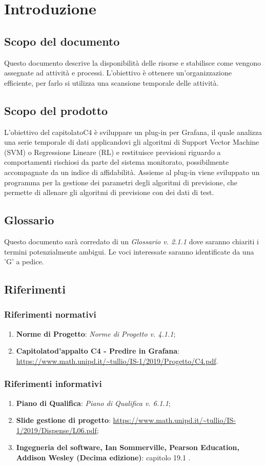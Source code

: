 \section{Introduzione}
	\subsection{Scopo del documento}
		Questo documento descrive la disponibilità delle risorse e stabilisce come vengono assegnate ad attività e processi\glo. L'obiettivo è ottenere un'organizzazione efficiente, per farlo si utilizza una scansione temporale delle attività.
	\subsection{Scopo del prodotto}
		L'obiettivo del capitolato\glosp C4 è sviluppare un plug-in per Grafana\glo, il quale analizza una serie temporale di dati applicandovi gli algoritmi di Support Vector Machine (SVM\glo) o Regressione Lineare (RL\glo) e restituisce previsioni riguardo a comportamenti rischiosi da parte del sistema monitorato, possibilmente accompagnate da un indice di affidabilità. Assieme al plug-in viene sviluppato un programma per la gestione dei parametri degli algoritmi di previsione, che permette di allenare gli algoritmi di previsione con dei dati di test.
	\subsection{Glossario}
		Questo documento sarà corredato di un \textit{Glossario v. 2.1.1} dove saranno chiariti i termini potenzialmente ambigui.
		Le voci interessate saranno identificate da una 'G' a pedice.
	\subsection{Riferimenti}
		\subsubsection{Riferimenti normativi}
			\begin{enumerate}
				\item \textbf{Norme di Progetto}: \textit{Norme di Progetto v. 4.1.1};
				\item \textbf{Capitolato}\glosp \textbf{d'appalto C4 - Predire in Grafana}\glo: \url{https://www.math.unipd.it/~tullio/IS-1/2019/Progetto/C4.pdf}.
			\end{enumerate}
		\subsubsection{Riferimenti informativi}
			\begin{enumerate}
				\item \textbf{Piano di Qualifica}: \textit{Piano di Qualifica v. 6.1.1};
				\item \textbf{Slide gestione di progetto}\glo: \url{https://www.math.unipd.it/~tullio/IS-1/2019/Dispense/L06.pdf};
				\item \textbf{Ingegneria del software, Ian Sommerville, Pearson Education, Addison Wesley (Decima edizione)}: capitolo 19.1 .
			\end{enumerate}
